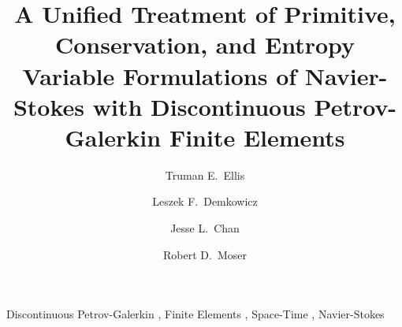 \documentclass[preprint,12pt]{elsarticle}
\begin{document}
\begin{frontmatter}



\title{A Unified Treatment of Primitive, Conservation, and Entropy Variable Formulations 
of Navier-Stokes with Discontinuous Petrov-Galerkin Finite Elements}


\author[ices]{Truman E.~Ellis}
\author[ices]{Leszek F.~Demkowicz}
\author[rice]{Jesse L.~Chan}
\author[ices]{Robert D.~Moser}

\address[ices]{Institute for Computational Engineering and Sciences,
University of Texas at Austin
201 East 24th St, Stop C0200, Austin, TX 78703}
\address[rice]{Computational and Applied Mathematics,
Rice University
6100 Main MS-134, Houston, TX 77005}

\begin{abstract}
\end{abstract}

\begin{keyword}


Discontinuous Petrov-Galerkin \sep
Finite Elements \sep
Space-Time \sep
Navier-Stokes
\end{keyword}

\end{frontmatter}
\end{document}
